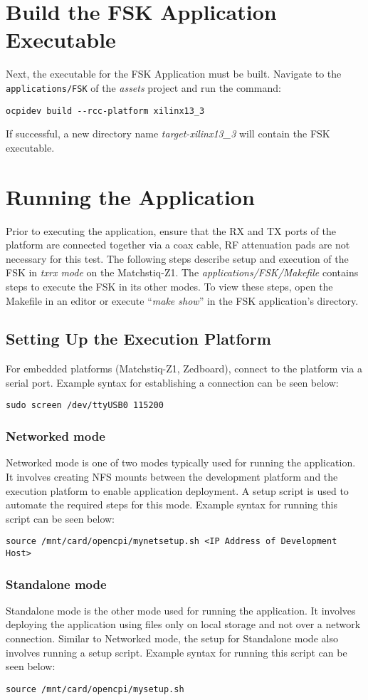 \begin{flushleft}
\section{Build the FSK Application Executable}
Next, the executable for the FSK Application must be built. Navigate to the \texttt{applications/FSK} of the \textit{assets} project and run the command:
\begin{verbatim}
ocpidev build --rcc-platform xilinx13_3
\end{verbatim}
If successful, a new directory name \textit{target-xilinx13\_3} will contain the FSK executable.

\section{Running the Application}
Prior to executing the application, ensure that the RX and TX ports of the platform are connected together via a coax cable, RF attenuation pads are not necessary for this test. The following steps describe setup and execution of the FSK in \textit{txrx mode} on the Matchstiq-Z1. The \textit{applications/FSK/Makefile} contains steps to execute the FSK in its other modes. To view these steps, open the Makefile in an editor or execute ``\textit{make show}'' in the FSK application's directory.
\subsection{Setting Up the Execution Platform}
For embedded platforms (Matchstiq-Z1, Zedboard), connect to the platform via a serial port. Example syntax for establishing a connection can be seen below:
\begin{verbatim}
sudo screen /dev/ttyUSB0 115200
\end{verbatim}
\subsubsection{Networked mode}
Networked mode is one of two modes typically used for running the application. It involves creating NFS mounts between the development platform and the execution platform to enable application deployment. A setup script is used to automate the required steps for this mode. Example syntax for running this script can be seen below:
\begin{verbatim}
source /mnt/card/opencpi/mynetsetup.sh <IP Address of Development Host>
\end{verbatim}
\subsubsection{Standalone mode}
Standalone mode is the other mode used for running the application. It involves deploying the application using files only on local storage and not over a network connection. Similar to Networked mode, the setup for Standalone mode also involves running a setup script. Example syntax for running this script can be seen below:
\begin{verbatim}
source /mnt/card/opencpi/mysetup.sh
\end{verbatim}

\end{flushleft}
